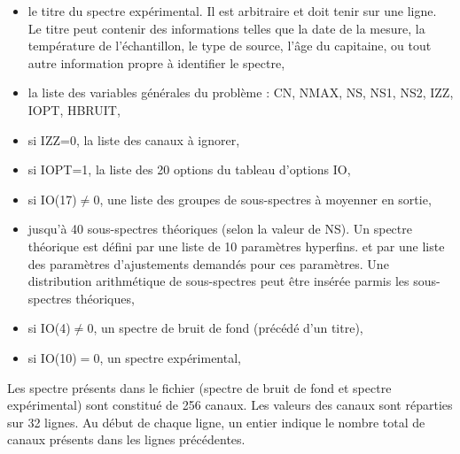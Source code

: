 \begin{itemize}
\item le titre du spectre expérimental. Il est arbitraire et doit tenir sur une ligne.
    Le titre peut contenir des informations telles que la date de la mesure, la température de l'échantillon, le type de source, l'âge du capitaine, ou tout autre information propre à identifier le spectre,
\item la liste des variables générales du problème : CN, NMAX, NS, NS1, NS2, IZZ, IOPT, HBRUIT,
\item si IZZ=0, la liste des canaux à ignorer,
\item si IOPT=1, la liste des 20 options du tableau d'options IO,
\item si IO(17)$\neq 0$, une liste des groupes de sous-spectres à moyenner en sortie,
\item jusqu'à 40 sous-spectres théoriques (selon la valeur de NS). Un spectre théorique est défini par une liste de 10 paramètres hyperfins.
    et par une liste des paramètres d'ajustements demandés pour ces paramètres.
    Une distribution arithmétique de sous-spectres peut être insérée parmis les sous-spectres théoriques,
\item si IO(4)$\neq 0 $, un spectre de bruit de fond (précédé d'un titre),
\item si IO(10)$=0$, un spectre expérimental,
\end{itemize}
Les spectre présents dans le fichier (spectre de bruit de fond et spectre expérimental) sont constitué de 256 canaux.
Les valeurs des canaux sont réparties sur 32 lignes.
 Au début de chaque ligne, un entier indique le nombre total de canaux présents dans les lignes précédentes. 

